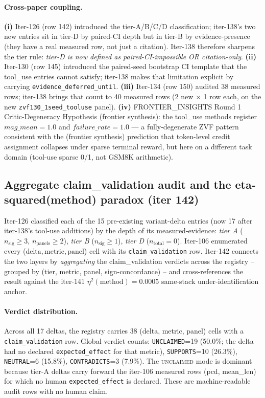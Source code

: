 \documentclass{article}
\begin{document}
\paragraph{Cross-paper coupling.}
\textbf{(i)} Iter-126 (row 142) introduced the tier-A/B/C/D
classification; iter-138's two new entries sit in tier-D by paired-CI
depth but in tier-B by evidence-presence (they have a real measured
row, not just a citation). Iter-138 therefore sharpens the tier rule:
\emph{tier-D is now defined as paired-CI-impossible OR
citation-only}. \textbf{(ii)} Iter-130 (row 145) introduced the
paired-seed bootstrap CI template that the tool\_use entries cannot
satisfy; iter-138 makes that limitation explicit by carrying
\texttt{evidence\_deferred\_until}. \textbf{(iii)} Iter-134 (row 150)
audited 38 measured rows; iter-138 brings that count to 40 measured
rows (2 new $\times$ 1 row each, on the new \texttt{zvf130\_1seed\_tooluse}
panel). \textbf{(iv)} FRONTIER\_INSIGHTS Round 1 Critic-Degeneracy
Hypothesis (frontier synthesis): the tool\_use methods register
$\mathit{mag\_mean}=1.0$ and $\mathit{failure\_rate}=1.0$ --- a
fully-degenerate ZVF pattern consistent with the (frontier synthesis)
prediction that token-level credit assignment collapses under sparse
terminal reward, but here on a different task domain (tool-use
sparse 0/1, not GSM8K arithmetic). 

\subsection{Aggregate claim\_validation audit and the eta-squared(method) paradox (iter 142)}
\label{sec:p6-iter142-verdict-aggregate}

Iter-126 classified each of the 15 pre-existing variant-delta
entries (now 17 after iter-138's tool-use additions) by the depth of its
measured-evidence: \emph{tier A} ($n_{\text{sig}} \geq 3$, $n_{\text{panels}}
\geq 2$), \emph{tier B} ($n_{\text{sig}} \geq 1$), \emph{tier D}
($n_{\text{total}} = 0$).  Iter-106 enumerated every
($\text{delta}, \text{metric}, \text{panel}$) cell with its
\texttt{claim\_validation} row.  Iter-142 connects the two layers by
\emph{aggregating} the claim\_validation verdicts across the registry --
grouped by (tier, metric, panel, sign-concordance) -- and cross-references
the result against the iter-141 $\eta^2(\text{method}) = 0.0005$
same-stack under-identification anchor.

\paragraph{Verdict distribution.}
Across all 17 deltas, the registry carries 38 (delta, metric, panel) cells
with a \texttt{claim\_validation} row.  Global verdict counts:
\texttt{UNCLAIMED}=19 (50.0\%; the delta had no declared
\texttt{expected\_effect} for that metric), \texttt{SUPPORTS}=10 (26.3\%),
\texttt{NEUTRAL}=6 (15.8\%), \texttt{CONTRADICTS}=3 (7.9\%).  The
\textsc{unclaimed} mode is dominant because tier-A deltas carry forward
the iter-106 measured rows (pcd, mean\_len) for which no human \texttt{expected\_effect}
is declared.  These are machine-readable audit rows with no human claim.
\end{document}

